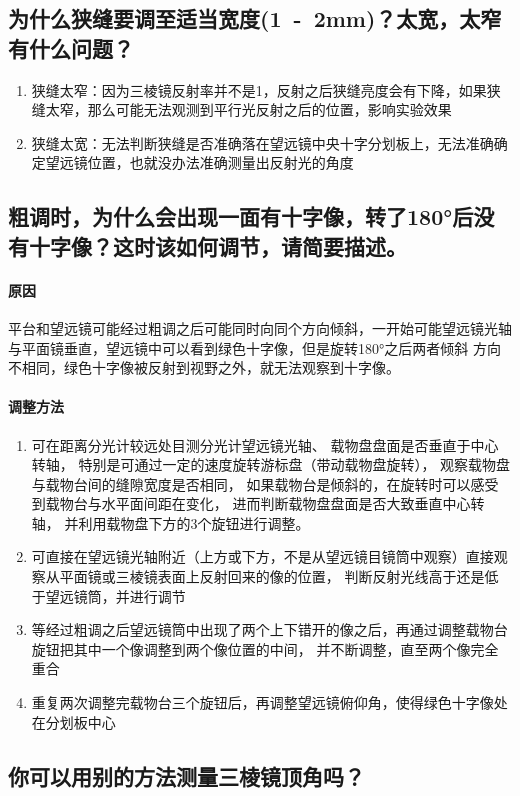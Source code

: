 \documentclass{../template/Report}%
\begin{document}
\subsection{为什么狭缝要调至适当宽度(\si{1-2}{mm})？太宽，太窄有什么问题？}
\begin{enumerate}
  \item 狭缝太窄：因为三棱镜反射率并不是1，反射之后狭缝亮度会有下降，如果狭缝太窄，那么可能无法观测到平行光反射之后的位置，影响实验效果
  \item 狭缝太宽：无法判断狭缝是否准确落在望远镜中央十字分划板上，无法准确确定望远镜位置，也就没办法准确测量出反射光的角度
\end{enumerate}
  \subsection{粗调时，为什么会出现一面有十字像，转了\ang{180}后没有十字像？这时该如何调节，请简要描述。}
\paragraph{原因} 平台和望远镜可能经过粗调之后可能同时向同个方向倾斜，一开始可能望远镜光轴与平面镜垂直，望远镜中可以看到绿色十字像，但是旋转\ang{180}之后两者倾斜
方向不相同，绿色十字像被反射到视野之外，就无法观察到十字像。
\paragraph{调整方法}
\begin{enumerate}
  \item 可在距离分光计较远处目测分光计望远镜光轴、
  载物盘盘面是否垂直于中心转轴，
  特别是可通过一定的速度旋转游标盘（带动载物盘旋转），
  观察载物盘与载物台间的缝隙宽度是否相同，
  如果载物台是倾斜的，在旋转时可以感受到载物台与水平面间距在变化，
  进而判断载物盘盘面是否大致垂直中心转轴，
  并利用载物盘下方的3个旋钮进行调整。
  \item 可直接在望远镜光轴附近（上方或下方，不是从望远镜目镜筒中观察）直接观察从平面镜或三棱镜表面上反射回来的像的位置，
  判断反射光线高于还是低于望远镜筒，并进行调节
  \item 等经过粗调之后望远镜筒中出现了两个上下错开的像之后，再通过调整载物台旋钮把其中一个像调整到两个像位置的中间，
  并不断调整，直至两个像完全重合
  \item 重复两次调整完载物台三个旋钮后，再调整望远镜俯仰角，使得绿色十字像处在分划板中心
\end{enumerate}
\subsection{你可以用别的方法测量三棱镜顶角吗？}
\end{document}
